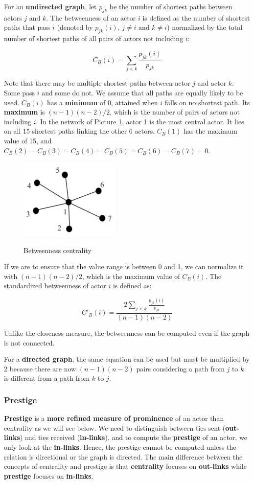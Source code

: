 For an \textbf{undirected graph}, let $p_{jk}$ be the number of shortest paths between actors $j$ and $k$. The betweenness of an actor $i$ is defined as the number of shortest paths that pass $i$ (denoted by $p_{jk}(i)$, $j \neq i$ and $k \neq i$) normalized by the total number of shortest paths of all pairs of actors not including $i$:

$$
C_B(i) = \sum_{j < k} \frac{p_{jk}(i)}{p_{jk}}
$$

Note that there may be multiple shortest paths between actor $j$ and actor $k$. Some pass $i$ and some do not. We assume that all paths are equally likely to be used. $C_B(i)$ has a \textbf{minimum} of 0, attained when $i$ falls on no shortest path. Its \textbf{maximum} is $(n-1)(n-2)/2$, which is the number of pairs of actors not including $i$. In the network of Picture \ref{bet}, actor 1 is the most central actor. It lies on all 15 shortest paths linking the other 6 actors. $C_B(1)$ has the maximum value of 15, and $C_B(2) = C_B(3) = C_B(4) = C_B(5) = C_B(6) = C_B(7) = 0$.

\begin{figure}[h!]
		\centering
		\includegraphics[scale = 1.8]{img/betweenness.jpg}
		\label{bet}
        \caption{Betweenness centrality}
\end{figure}

If we are to ensure that the value range is between 0 and 1, we can normalize it with $(n-1)(n-2)/2$, which is the maximum value of $C_B(i)$. The standardized betweenness of actor $i$ is defined as:

$$
C'_B(i) = \frac{2 \sum_{j < k} \frac{p_{jk}(i)}{p_{jk}}}{(n-1)(n-2)}
$$

Unlike the closeness measure, the betweenness can be computed even if the graph is not connected.

For a \textbf{directed graph}, the same equation can be used but must be multiplied by 2 because there are now $(n-1)(n-2)$ pairs considering a path from $j$ to $k$ is different from a path from $k$ to $j$.

\subsubsection{Prestige}
\textbf{Prestige} is a \textbf{more refined measure of prominence} of an actor than centrality as we will see below. We need to distinguish between ties sent (\textbf{out-links}) and ties received (\textbf{in-links}), and to compute the \textbf{prestige} of an actor, we only look at the \textbf{in-links}. Hence, the prestige cannot be computed unless the relation is directional or the graph is directed. The main difference between the concepts of centrality and prestige is that \textbf{centrality} focuses on \textbf{out-links} while \textbf{prestige} focuses on \textbf{in-links}. 

